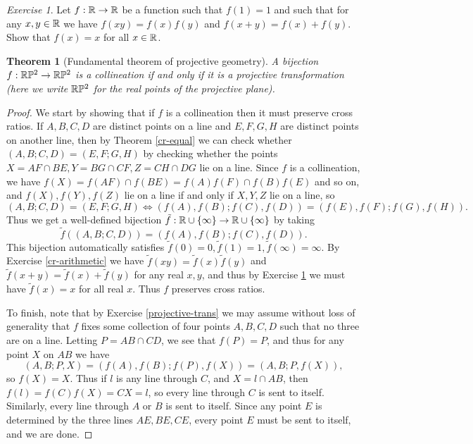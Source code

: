 \documentclass[letterpaper,11pt]{article}
\newtheorem{thm}{Theorem}
\theoremstyle{definition}
\theoremstyle{remark}
\newtheorem{exer}{Exercise}
\begin{document}
\begin{exer}\label{rigid-R} Let $f:\mathbb{R}\rightarrow\mathbb{R}$ be a function such that $f(1) = 1$ and such that for any $x,y \in \mathbb{R}$ we have $f(xy) = f(x)f(y)$ and $f(x+y) = f(x)+f(y)$. Show that $f(x) = x$ for all $x\in \mathbb{R}$.
\end{exer}

\begin{thm}[Fundamental theorem of projective geometry] A bijection $f:\mathbb{R}\mathbb{P}^2 \rightarrow \mathbb{R}\mathbb{P}^2$ is a collineation if and only if it is a projective transformation (here we write $\mathbb{R}\mathbb{P}^2$ for the \emph{real} points of the projective plane).
\end{thm}
\begin{proof} We start by showing that if $f$ is a collineation then it must preserve cross ratios. If $A,B,C,D$ are distinct points on a line and $E,F,G,H$ are distinct points on another line, then by Theorem \ref{cr-equal} we can check whether $(A,B;C,D) = (E,F;G,H)$ by checking whether the points $X = AF\cap BE, Y = BG\cap CF, Z = CH\cap DG$ lie on a line. Since $f$ is a collineation, we have $f(X) = f(AF)\cap f(BE) = f(A)f(F)\cap f(B)f(E)$ and so on, and $f(X), f(Y), f(Z)$ lie on a line if and only if $X,Y,Z$ lie on a line, so
\[
(A,B;C,D) = (E,F;G,H) \iff (f(A),f(B);f(C),f(D)) = (f(E),f(F);f(G),f(H)).
\]
Thus we get a well-defined bijection $\tilde{f}:\mathbb{R}\cup\{\infty\}\rightarrow\mathbb{R}\cup\{\infty\}$ by taking
\[
\tilde{f}((A,B;C,D)) = (f(A),f(B);f(C),f(D)).
\]
This bijection automatically satisfies $\tilde{f}(0) = 0, \tilde{f}(1) = 1, \tilde{f}(\infty) = \infty$. By Exercise \ref{cr-arithmetic} we have $\tilde{f}(xy) = \tilde{f}(x)\tilde{f}(y)$ and $\tilde{f}(x+y) = \tilde{f}(x)+\tilde{f}(y)$ for any real $x,y$, and thus by Exercise \ref{rigid-R} we must have $\tilde{f}(x) = x$ for all real $x$. Thus $f$ preserves cross ratios.

To finish, note that by Exercise \ref{projective-trans} we may assume without loss of generality that $f$ fixes some collection of four points $A,B,C,D$ such that no three are on a line. Letting $P = AB\cap CD$, we see that $f(P) = P$, and thus for any point $X$ on $AB$ we have
\[
(A,B;P,X) = (f(A),f(B);f(P),f(X)) = (A,B;P,f(X)),
\]
so $f(X) = X$. Thus if $l$ is any line through $C$, and $X = l \cap AB$, then $f(l) = f(C)f(X) = CX = l$, so every line through $C$ is sent to itself. Similarly, every line through $A$ or $B$ is sent to itself. Since any point $E$ is determined by the three lines $AE,BE,CE$, every point $E$ must be sent to itself, and we are done.
\end{proof}
\end{document}
